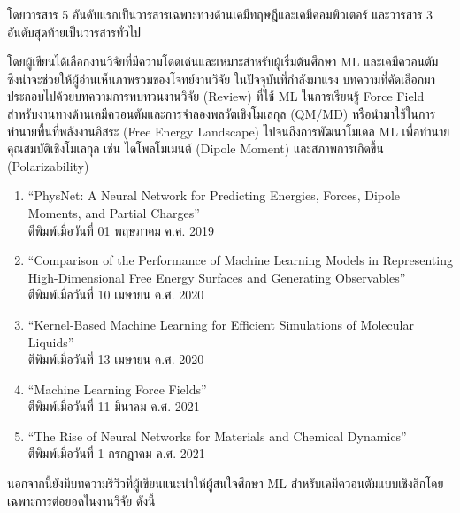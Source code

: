 \noindent โดยวารสาร 5 อันดับแรกเป็นวารสารเฉพาะทางด้านเคมีทฤษฎีและเคมีคอมพิวเตอร์ และวารสาร 3 อันดับสุดท้ายเป็นวารสารทั่วไป

โดยผู้เขียนได้เลือกงานวิจัยที่มีความโดดเด่นและเหมาะสำหรับผู้เริ่มต้นศึกษา ML และเคมีควอนตัม ซึ่งน่าจะช่วยให้ผู้อ่านเห็นภาพรวมของโจทย์งานวิจัย%
ในปัจจุบันที่กำลังมาแรง บทความที่คัดเลือกมาประกอบไปด้วยบทความการทบทวนงานวิจัย (Review) ที่ใช้ ML ในการเรียนรู้ Force Field 
สำหรับงานทางด้านเคมีควอนตัมและการจําลองพลวัตเชิงโมเลกุล (QM/MD) หรือนำมาใช้ในการทำนายพื้นที่พลังงานอิสระ (Free Energy Landscape)
ไปจนถึงการพัฒนาโมเดล ML เพื่อทำนายคุณสมบัติเชิงโมเลกุล เช่น ไดโพลโมเมนต์ (Dipole Moment) และสภาพการเกิดขึ้น (Polarizability)

\begin{enumerate}
    \item \enquote{PhysNet: A Neural Network for Predicting Energies, Forces, Dipole Moments, and 
    Partial Charges}\autocite{unke2019}\\
    ตีพิมพ์เมื่อวันที่ 01 พฤษภาคม ค.ศ. 2019
    
    \item \enquote{Comparison of the Performance of Machine Learning Models in Representing High-Dimensional 
    Free Energy Surfaces and Generating Observables}\autocite{cendagorta2020}\\
    ตีพิมพ์เมื่อวันที่ 10 เมษายน ค.ศ. 2020
    
    \item \enquote{Kernel-Based Machine Learning for Efficient Simulations of Molecular Liquids}\autocite{scherer2020}\\
    ตีพิมพ์เมื่อวันที่ 13 เมษายน ค.ศ. 2020

    \item \enquote{Machine Learning Force Fields}\autocite{unke2021}\\
    ตีพิมพ์เมื่อวันที่ 11 มีนาคม ค.ศ. 2021

    \item \enquote{The Rise of Neural Networks for Materials and Chemical Dynamics}\autocite{kulichenko2021}\\
    ตีพิมพ์เมื่อวันที่ 1 กรกฎาคม ค.ศ. 2021

\end{enumerate}

นอกจากนี้ยังมีบทความรีวิวที่ผู้เขียนแนะนำให้ผู้สนใจศึกษา ML สำหรับเคมีควอนตัมแบบเชิงลึกโดยเฉพาะการต่อยอดในงานวิจัย ดังนี้

